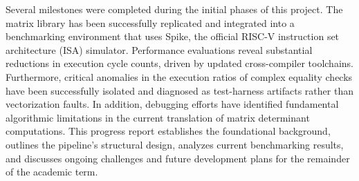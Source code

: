 Several milestones were completed during the initial phases of this project. The matrix library has been successfully replicated and integrated into a benchmarking environment that uses Spike, the official RISC-V instruction set architecture (ISA) simulator. Performance evaluations reveal substantial reductions in execution cycle counts, driven by updated cross-compiler toolchains. Furthermore, critical anomalies in the execution ratios of complex equality checks have been successfully isolated and diagnosed as test-harness artifacts rather than vectorization faults. In addition, debugging efforts have identified fundamental algorithmic limitations in the current translation of matrix determinant computations. This progress report establishes the foundational background, outlines the pipeline's structural design, analyzes current benchmarking results, and discusses ongoing challenges and future development plans for the remainder of the academic term.